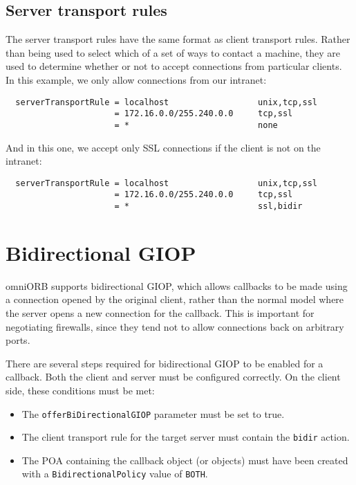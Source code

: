 \documentclass[draft,11pt,twoside,a4paper]{book}
\newcommand{\code}[1]{\texttt{#1}}
\begin{document}
\subsection{Server transport rules}
\label{sec:serverRule}

The server transport rules have the same format as client transport
rules. Rather than being used to select which of a set of ways to
contact a machine, they are used to determine whether or not to accept
connections from particular clients. In this example, we only allow
connections from our intranet:

\begin{verbatim}
  serverTransportRule = localhost                  unix,tcp,ssl
                      = 172.16.0.0/255.240.0.0     tcp,ssl
                      = *                          none
\end{verbatim}

\noindent And in this one, we accept only SSL connections if the
client is not on the intranet:

\begin{verbatim}
  serverTransportRule = localhost                  unix,tcp,ssl
                      = 172.16.0.0/255.240.0.0     tcp,ssl
                      = *                          ssl,bidir
\end{verbatim}




\section{Bidirectional GIOP}
\label{sec:bidir}

omniORB supports bidirectional GIOP, which allows callbacks to be made
using a connection opened by the original client, rather than the
normal model where the server opens a new connection for the callback.
This is important for negotiating firewalls, since they tend not to
allow connections back on arbitrary ports.

There are several steps required for bidirectional GIOP to be enabled
for a callback. Both the client and server must be configured
correctly. On the client side, these conditions must be met:

\begin{itemize}

\item The \code{offerBiDirectionalGIOP} parameter must be set to true. 
\item The client transport rule for the target server must contain the
      \code{bidir} action.
\item The POA containing the callback object (or objects) must have
      been created with a \code{BidirectionalPolicy} value of
      \code{BOTH}.

\end{itemize}
\end{document}
